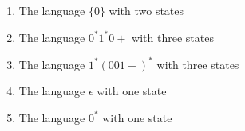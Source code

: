 \begin{enumerate}
\begin{enumerate}
              \item The language $\{0\}$ with two states
              \item The language $0^\ast1^\ast0+$ with three states
              \item The language $1^\ast(001+)^\ast$ with three states
              \item The language ${\epsilon}$ with one state
              \item The language $0^\ast$ with one state
          \end{enumerate}

\end{enumerate}
